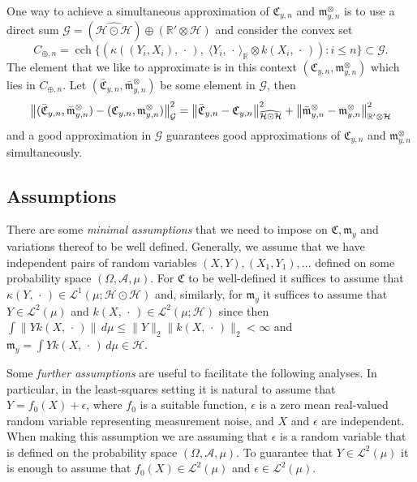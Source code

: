\documentclass[10pt]{amsart}
\theoremstyle{definition}\newtheorem{defi}[theo]{Definition}\newtheorem{rema}[theo]{Remark}\newtheorem{exam}[theo]{Example}\newtheorem{exem}[theo]{Example}\newtheorem{nota}[theo]{Notation}
\theoremstyle{remark}
\DeclareMathOperator{\cch}{cch}
\newcommand{\R}{\mathbb{R}}
\newcommand{\dR}{{\R'}}
\newcommand{\clA}{\mathcal{A}}
\newcommand{\cH}{\mathcal{H}}
\newcommand{\clL}{\mathcal{L}}
\newcommand{\clG}{\mathcal{G}}
\newcommand{\fkC}{\mathfrak{C}}
\newcommand{\mean}{\mathfrak{m}}
\newcommand{\bn}{\bm{\|}}
\let\originalleft\left
\let\originalright\right
\renewcommand{\left}{\mathopen{}\mathclose\bgroup\originalleft}
\renewcommand{\right}{\aftergroup\egroup\originalright}
\begin{document}
One way to achieve a simultaneous approximation of $\fkC_{y,n}$ and $\mean_{y,n}^\otimes$ is to use a direct sum $\clG = (\widehat{\cH \odot \cH}) \oplus (\dR \otimes \cH)$ and consider the convex set
\[
C_{\oplus,n} = \cch \bigl\{ (\kappa((Y_i,X_i),\,\cdot\,), \;\langle Y_i,\,\cdot\, \rangle_\R \otimes k(X_i, \,\cdot\,)) : i \leq n \bigr\}\subset \clG.
\]
The element that we like to approximate is in this context $(\fkC_{y,n}, \mean^\otimes_{y,n})$ which lies in $C_{\oplus,n}$. Let $(\bar{\fkC}_{y,n}, \bar{\mean}_{y,n}^\otimes)$ be some element in $\clG$, then
\begin{align*}
\left\| (\bar{\fkC}_{y,n}, \bar{\mean}_{y,n}^\otimes) - (\fkC_{y,n}, \mean_{y,n}^\otimes) \right\|_{\clG}^2 =
\left\| \bar{\fkC}_{y,n} - \fkC_{y,n} \right\|_{\widehat{\cH \odot \cH}}^2 + \left\| \bar{\mean}^\otimes_{y,n} - \mean_{y,n}^\otimes \right\|_{\dR \otimes \cH}^2
\end{align*}
and a good approximation in $\clG$ guarantees good approximations of $\fkC_{y,n}$ and $\mean_{y,n}^\otimes$ simultaneously.



\subsection{Assumptions} There are some \emph{minimal assumptions} that we need to impose on $\fkC, \mean_y$ and variations thereof to be well defined. Generally, we assume that we have independent pairs of random variables $(X,Y),(X_1,Y_1), \dots$ defined on some probability space $(\Omega,\clA,\mu)$. For $\fkC$ to be well-defined it suffices to assume that $\kappa(Y,\,\cdot\,) \in \clL^1(\mu;\cH \odot \cH)$ and, similarly, for $\mean_y$ it suffices to assume that $Y \in \clL^2(\mu)$ and $k(X,\,\cdot\,) \in \clL^2(\mu;\cH)$ since then $\int \| Y k(X,\,\cdot\,) \| \, d\mu \leq \|Y\|_2 \bn k(X,\,\cdot\,)\bn_2 < \infty$ and $\mean_y = \int Y k(X,\,\cdot\,) \, d\mu \in \cH$.

Some \emph{further assumptions} are useful to facilitate the following analyses. In particular, in the least-squares setting it is natural to assume that $Y = f_0(X) + \epsilon$, where $f_0$ is a suitable function, $\epsilon$ is a zero mean real-valued random variable representing measurement noise, and $X$ and $\epsilon$ are independent. When making this assumption we are assuming that $\epsilon$ is a random variable that is defined on the probability space $(\Omega,\clA,\mu)$. To guarantee that $Y \in \clL^2(\mu)$ it is enough to assume that $f_0(X) \in \clL^2(\mu)$ and $\epsilon \in \clL^2(\mu)$.
\end{document}
